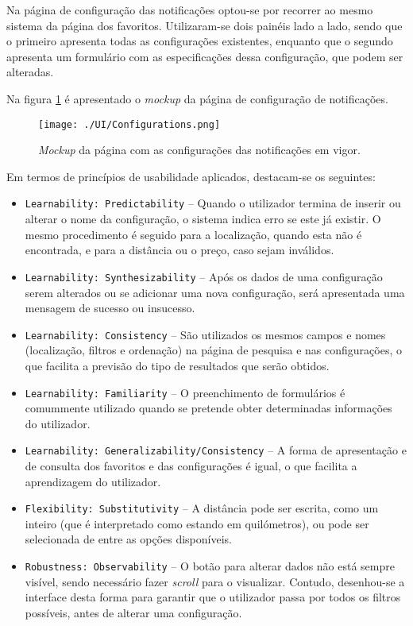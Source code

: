 Na página de configuração das notificações optou-se por recorrer ao mesmo sistema da página dos favoritos. Utilizaram-se dois painéis lado a lado, sendo que o primeiro apresenta todas as configurações existentes, enquanto que o segundo apresenta um formulário com as especificações dessa configuração, que podem ser alteradas.

Na figura \ref{fig:configurations} é apresentado o \textit{mockup} da página de configuração de notificações.

\begin{figure}[H]
    \centering
    \texttt{[image: ./UI/Configurations.png]}
    \caption{\textit{Mockup} da página com as configurações das notificações em vigor.}
    \label{fig:configurations}
\end{figure}

Em termos de princípios de usabilidade aplicados, destacam-se os seguintes:

\begin{itemize}
    \item \texttt{Learnability: Predictability} -- Quando o utilizador termina de inserir ou alterar o nome da configuração, o sistema indica erro se este já existir. O mesmo procedimento é seguido para a localização, quando esta não é encontrada, e para a distância ou o preço, caso sejam inválidos.
    
    \item \texttt{Learnability: Synthesizability} -- Após os dados de uma configuração serem alterados ou se adicionar uma nova configuração, será apresentada uma mensagem de sucesso ou insucesso.
    
    \item \texttt{Learnability: Consistency} -- São utilizados os mesmos campos e nomes (localização, filtros e ordenação) na página de pesquisa e nas configurações, o que facilita a previsão do tipo de resultados que serão obtidos.
    
    \item \texttt{Learnability: Familiarity} -- O preenchimento de formulários é comummente utilizado quando se pretende obter determinadas informações do utilizador.
    
    \item \texttt{Learnability: Generalizability/Consistency} -- A forma de apresentação e de consulta dos favoritos e das configurações é igual, o que facilita a aprendizagem do utilizador.
    
    \item \texttt{Flexibility: Substitutivity} -- A distância pode ser escrita, como um inteiro (que é interpretado como estando em quilómetros), ou pode ser selecionada de entre as opções disponíveis.
    
    \item \texttt{Robustness: Observability} -- O botão para alterar dados não está sempre visível, sendo necessário fazer \textit{scroll} para o visualizar. Contudo, desenhou-se a interface desta forma para garantir que o utilizador passa por todos os filtros possíveis, antes de alterar uma configuração.
\end{itemize}

